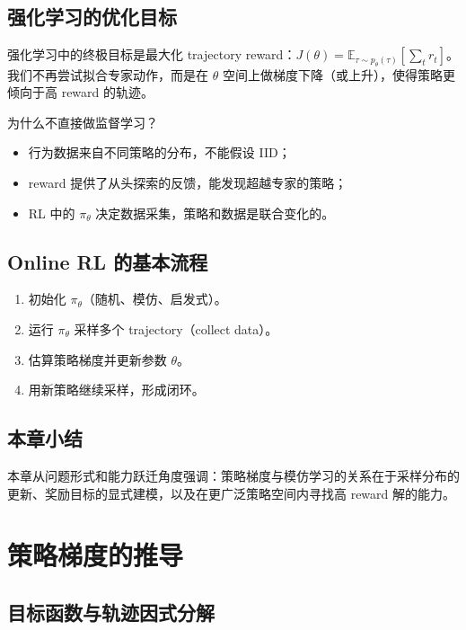 \documentclass[a4paper]{article}
\begin{document}
\subsection{强化学习的优化目标}

强化学习中的终极目标是最大化 trajectory reward：$J(\theta) = \mathbb{E}_{\tau \sim p_\theta(\tau)} [\sum_t r_t]$。我们不再尝试拟合专家动作，而是在 $\theta$ 空间上做梯度下降（或上升），使得策略更倾向于高 reward 的轨迹。

\begin{importantbox}{为什么不直接做监督学习？}
\begin{itemize}
    \item 行为数据来自不同策略的分布，不能假设 IID；
    \item reward 提供了从头探索的反馈，能发现超越专家的策略；
    \item RL 中的 $\pi_\theta$ 决定数据采集，策略和数据是联合变化的。
\end{itemize}
\end{importantbox}

\subsection{Online RL 的基本流程}

\begin{enumerate}
    \item 初始化 $\pi_\theta$（随机、模仿、启发式）。
    \item 运行 $\pi_\theta$ 采样多个 trajectory（collect data）。
    \item 估算策略梯度并更新参数 $\theta$。
    \item 用新策略继续采样，形成闭环。
\end{enumerate}

\subsection{本章小结}

本章从问题形式和能力跃迁角度强调：策略梯度与模仿学习的关系在于采样分布的更新、奖励目标的显式建模，以及在更广泛策略空间内寻找高 reward 解的能力。

\section{策略梯度的推导}

\subsection{目标函数与轨迹因式分解}
\end{document}
